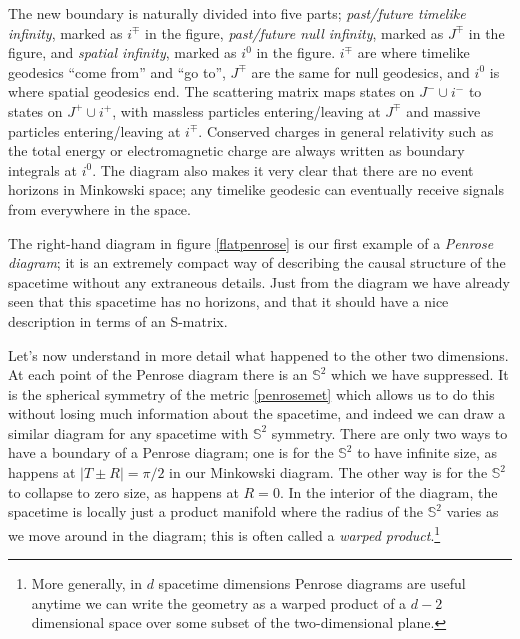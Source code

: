 \documentclass[12pt]{article}
\begin{document}
The new boundary is naturally divided into five parts; \textit{past/future timelike infinity}, marked as $i^{\mp}$ in the figure, \textit{past/future null infinity}, marked as $J^\mp$ in the figure, and \textit{spatial infinity}, marked as $i^0$ in the figure.  $i^{\mp}$ are where timelike geodesics ``come from'' and ``go to'', $J^\mp$ are the same for null geodesics, and $i^0$ is where spatial geodesics end.  The scattering matrix maps states on $J^-\cup i^-$ to states on $J^+\cup i^+$, with massless particles entering/leaving at $J^{\mp}$ and massive particles entering/leaving at $i^{\mp}$.  Conserved charges in general relativity such as the total energy or electromagnetic charge are always written as boundary integrals at $i^0$.  The diagram also makes it very clear that there are no event horizons in Minkowski space; any timelike geodesic can eventually receive signals from everywhere in the space.  

The right-hand diagram in figure \ref{flatpenrose} is our first example of a \textit{Penrose diagram}; it is an extremely compact way of describing the causal structure of the spacetime without any extraneous details.  Just from the diagram we have already seen that this spacetime has no horizons, and that it should have a nice description in terms of an S-matrix.  

Let's now understand in more detail what happened to the other two dimensions.  At each point of the Penrose diagram there is an $\mathbb{S}^2$ which we have suppressed.  It is the spherical symmetry of the metric \eqref{penrosemet} which allows us to do this without losing much information about the spacetime, and indeed we can draw a similar diagram for any spacetime with $\mathbb{S}^2$ symmetry.  There are only two ways to have a boundary of a Penrose diagram; one is for the $\mathbb{S}^2$ to have infinite size, as happens at $|T\pm R|=\pi/2$ in our Minkowski diagram.  The other way is for the $\mathbb{S}^2$ to collapse to zero size, as happens at $R=0$.  In the interior of the diagram, the spacetime is locally just a product manifold where the radius of the $\mathbb{S}^2$ varies as we move around in the diagram; this is often called a \textit{warped product}.\footnote{More generally, in $d$ spacetime dimensions Penrose diagrams are useful anytime we can write the geometry as a warped product of a $d-2$ dimensional space over some subset of the two-dimensional plane.}
\end{document}
